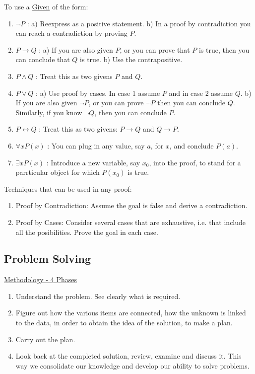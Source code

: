 \documentclass[12pt]{article}
\begin{document}
\begin{flushleft}
	
	\textbullet \quad  To use a \uline{Given} of the form:  
	\begin{enumerate}
	\item $\lnot P$  :  a) Reexpress as a positive statement. \linebreak 
							 b) In a proof by contradiction you can reach a contradiction by proving $P$. 
	\item $P \rightarrow Q$  :  a) If you are also given $P$, or you can prove that $P$ is true, then you can conclude that $Q$ is true. \linebreak 					   b) Use the contrapositive. 
	\item $P \land Q$  :  Treat this as two givens $P$ and $Q$. 
	\item $P \lor Q$  :  a) Use proof by cases. In case 1 assume $P$ and in case 2 assume $Q$. \linebreak 
								b) If you are also given $\lnot P$, or you can prove $\lnot P$ then you can conclude $Q$. Similarly, if you know $\lnot Q$, then you can conclude $P$. 
	\item $P \leftrightarrow Q$  :  Treat this as two givens: $P \rightarrow Q$ and $Q\rightarrow P$. 
	\item $\forall x P(x)$  :  You can plug in any value, say $a$, for $x$, and conclude $P(a)$. 
	\item $\exists x P(x)$  :  Introduce a new variable, say $x_0$, into the proof, to stand for a parrticular object for which $P(x_0)$ is true. \linebreak
	\end{enumerate}  
	 
	
	\textbullet \quad Techniques that can be used in any proof:  
	\begin{enumerate}
	\item Proof by Contradiction: Assume the goal is false and derive a contradiction. 
	\item Proof by Cases: Consider several cases that are exhaustive, i.e. that include all the posibilities. Prove the goal in each case.\linebreak
	\end{enumerate}  
	
	\subsection{Problem Solving}
	
	\uline{Methodology - 4 Phases}  
	\begin{enumerate}
	\item Understand the problem. See clearly what is required. 
	\item Figure out how the various items are connected, how the unknown is linked to the data, in order to obtain the idea of the solution, to make a plan. 
	\item Carry out the plan. 
	\item Look back at the completed solution, review, examine and discuss it. This way we consolidate our knowledge and develop our ability to solve problems. \linebreak
	\end{enumerate} 
	 

\end{flushleft}
\end{document}
